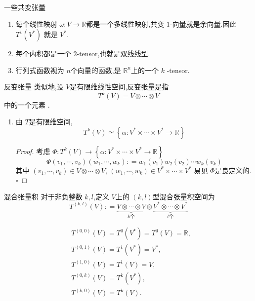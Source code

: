\documentclass[../../几何与拓扑.tex]{subfiles}
\begin{document}
\begin{example}{一些共变张量}
    \begin{enumerate}
        \item 每个线性映射 $ \omega: V\to \mathbb{R}  $都是一个多线性映射,共变 $ 1 $-向量就是余向量.因此 $ T^{1}\left( V^{*} \right)  $   就是 $ V^{*} $.
        \item 每个内积都是一个 $ 2 $-tensor,也就是双线线型.
        \item 行列式函数视为  $ n $个向量的函数,是 $ \mathbb{R} ^{n} $上的一个 $ k $ -tensor.   
    \end{enumerate}
    


    
\end{example}

\begin{definition}{反变张量}
    类似地,设 $ V $是有限维线性空间,反变张量是指 $$
    T^{k}\left( V \right) =V\otimes \cdots \otimes V
    $$中的一个元素 .
\end{definition}

\begin{remark}
    \begin{enumerate}
        \item 由 $ T $是有限维空间, $$
        T^{k}\left( V \right)    \simeq   \left\{ \alpha: V^{*}\times \cdots \times V^{*}\to \mathbb{R}  \right\} 
        $$

        \begin{proof}
            考虑 \(  \Phi : T^{k}\left( V \right) \to \left\{ \alpha : V^{*}\times \cdots \times V^{*}\to \mathbb{R}  \right\}   \) \[
            \Phi \left(  v_1,\cdots,v_k  \right)\left(  w_1,\cdots,w_k  \right): =  w_1\left( v_1 \right)w_2\left( v_2 \right)\cdots w_{k}\left( v_{k} \right)     
            \] 其中 \(  \left(  v_1,\cdots,v_k  \right)\in V\otimes \cdots \otimes V   \), \(  \left( w_1,\cdots ,w_{k} \right) \in V^{*}\times \cdots \times V^{*}   \)  
            易见 \(  \Phi   \)是良定义的. 
            \hfill $\square$
        \end{proof}
    \end{enumerate}

\end{remark}

\begin{definition}{混合张量积}
    对于非负整数 $ k,l $,定义 $ V $上的  $ \left( k,l \right)  $型混合张量积空间为 $$
    T^{\left( k,l \right) }\left( V \right): = \underbrace{V\otimes \cdots \otimes V}_{k\text{个}}\otimes \underbrace{V^{*}\otimes \cdots \otimes V^{*}}_{l\text{个}}
    $$  
\end{definition}
\begin{remark}
    $$\begin{aligned}&T^{(0,0)}(V)=T^0(V^*)=T^0(V)=\mathbb{R},\\&T^{(0,1)}(V)=T^1(V^*)=V^*,\\&T^{(1,0)}(V)=T^1(V)=V,\\&T^{(0,k)}(V)=T^k(V^*),\\&T^{(k,0)}(V)=T^k(V).\end{aligned}$$
\end{remark}
\end{document}
